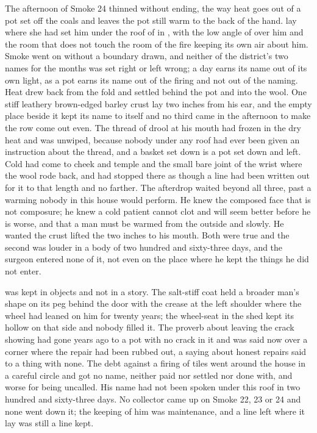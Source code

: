 The afternoon of Smoke 24 thinned without ending, the way heat goes out of a pot set off the coals and leaves the pot still warm to the back of the hand.  lay where she had set him under the roof of  in , with the low angle of  over him and the room that does not touch the room of the fire keeping its own air about him. Smoke went on without a boundary drawn, and neither of the district's two names for the months was set right or left wrong; a day earns its name out of its own light, as a pot earns its name out of the firing and not out of the naming. Heat drew back from the fold and settled behind the pot and into the wool. One stiff leathery brown-edged barley crust lay two inches from his ear, and the empty place beside it kept its name to itself and no third came in the afternoon to make the row come out even. The thread of drool at his mouth had frozen in the dry heat and was unwiped, because nobody under any roof had ever been given an instruction about the thread, and a basket set down is a pot set down and left. Cold had come to cheek and temple and the small bare joint of the wrist where the wool rode back, and had stopped there as though a line had been written out for it to that length and no farther. The afterdrop waited beyond all three, past a warming nobody in this house would perform. He knew the composed face that is not composure; he knew a cold patient cannot clot and will seem better before he is worse, and that a man must be warmed from the outside and slowly. He wanted the crust lifted the two inches to his mouth. Both were true and the second was louder in a body of two hundred and sixty-three days, and the surgeon entered none of it, not even on the place where he kept the things he did not enter.

 was kept in objects and not in a story. The salt-stiff coat held a broader man's shape on its peg behind the door with the crease at the left shoulder where the wheel had leaned on him for twenty years; the wheel-seat in the shed kept its hollow on that side and nobody filled it. The proverb about leaving the crack showing had gone years ago to a pot with no crack in it and was said now over a corner where the repair had been rubbed out, a saying about honest repairs said to a thing with none. The debt against a firing of tiles went around the house in a careful circle and got no name, neither paid nor settled nor done with, and worse for being uncalled. His name had not been spoken under this roof in two hundred and sixty-three days. No collector came up  on Smoke 22, 23 or 24 and none went down it; the keeping of him was maintenance, and a line left where it lay was still a line kept.

